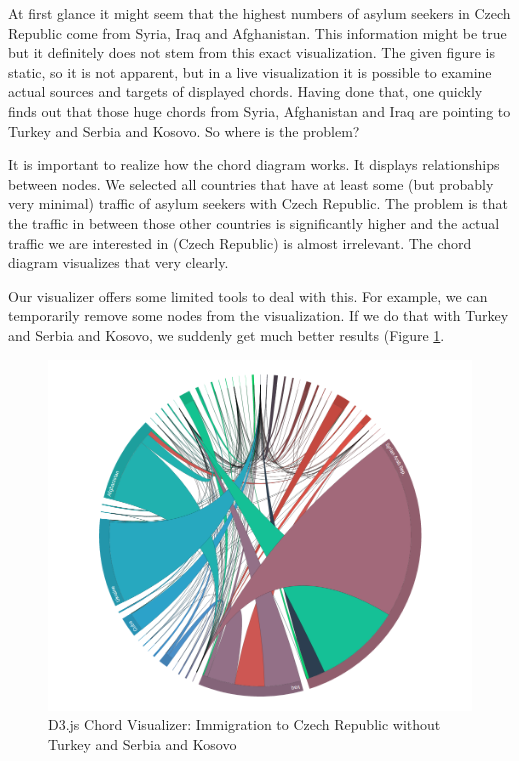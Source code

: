 At first glance it might seem that the highest numbers of asylum seekers in Czech Republic come from Syria, Iraq and Afghanistan. This information might be true but it definitely does not stem from this exact visualization. The given figure is static, so it is not apparent, but in a live visualization it is possible to examine actual sources and targets of displayed chords. Having done that, one quickly finds out that those huge chords from Syria, Afghanistan and Iraq are pointing to Turkey and Serbia and Kosovo. So where is the problem?

It is important to realize how the chord diagram works. It displays relationships between nodes. We selected all countries that have at least some (but probably very minimal) traffic of asylum seekers with Czech Republic. The problem is that the traffic in between those other countries is significantly higher and the actual traffic we are interested in (Czech Republic) is almost irrelevant. The chord diagram visualizes that very clearly.

Our visualizer offers some limited tools to deal with this. For example, we can temporarily remove some nodes from the visualization. If we do that with Turkey and Serbia and Kosovo, we suddenly get much better results (Figure \ref{fig:chord-immigration-to-cr-2}.

\begin{figure}
	\centering
	\includegraphics[width=145mm]{img/06_chord_immigration_to_cr_2}
	\caption{D3.js Chord Visualizer: Immigration to Czech Republic without Turkey and Serbia and Kosovo}
    \label{fig:chord-immigration-to-cr-2}
\end{figure}

